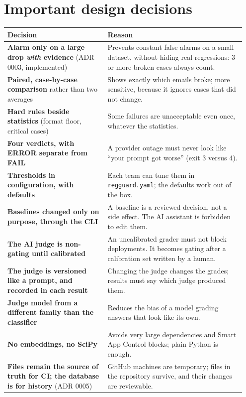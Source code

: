 \documentclass[11pt,a4paper]{article}
\newcommand{\code}[1]{\nolinkurl{#1}}
\begin{document}
\section{Important design decisions}
\label{sec:decisions}

\begin{longtable}{@{}p{0.40\linewidth}p{0.55\linewidth}@{}}
\toprule
\textbf{Decision} & \textbf{Reason} \\
\midrule
\endhead
\textbf{Alarm only on a large drop \emph{with} evidence} (ADR 0003, implemented) & Prevents constant false alarms on a small dataset, without hiding real regressions: 3 or more broken cases always count. \\
\textbf{Paired, case-by-case comparison} rather than two averages & Shows exactly which emails broke; more sensitive, because it ignores cases that did not change. \\
\textbf{Hard rules beside statistics} (format floor, critical cases) & Some failures are unacceptable even once, whatever the statistics. \\
\textbf{Four verdicts, with ERROR separate from FAIL} & A provider outage must never look like ``your prompt got worse'' (exit 3 versus 4). \\
\textbf{Thresholds in configuration, with defaults} & Each team can tune them in \code{regguard.yaml}; the defaults work out of the box. \\
\textbf{Baselines changed only on purpose, through the CLI} & A baseline is a reviewed decision, not a side effect. The AI assistant is forbidden to edit them. \\
\textbf{The AI judge is non-gating until calibrated} & An uncalibrated grader must not block deployments. It becomes gating after a calibration set written by a human. \\
\textbf{The judge is versioned like a prompt, and recorded in each result} & Changing the judge changes the grades; results must say which judge produced them. \\
\textbf{Judge model from a different family than the classifier} & Reduces the bias of a model grading answers that look like its own. \\
\textbf{No embeddings, no SciPy} & Avoids very large dependencies and Smart App Control blocks; plain Python is enough. \\
\textbf{Files remain the source of truth for CI; the database is for history} (ADR 0005) & GitHub machines are temporary; files in the repository survive, and their changes are reviewable. \\

\end{longtable}
\end{document}
